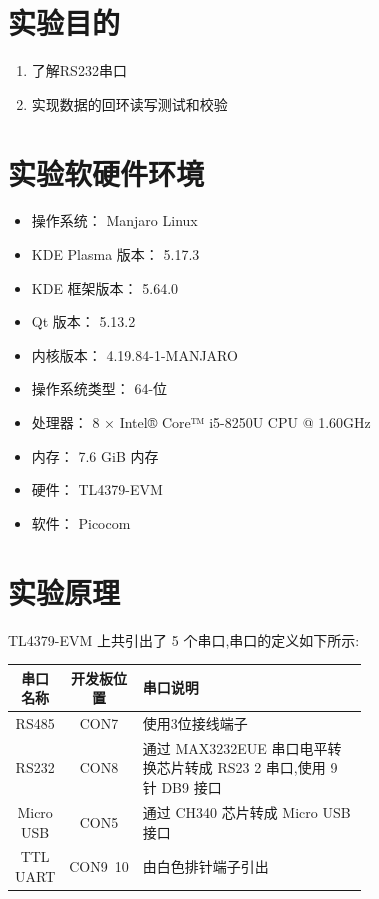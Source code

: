 \documentclass{embedding}
\begin{document}
\maketitle

\tableofcontents
\newpage

\section{实验目的}

\begin{enumerate}
\item 了解RS232串口
\item 实现数据的回环读写测试和校验
\end{enumerate}

\section{实验软硬件环境}

\begin{itemize}
    \item 操作系统： Manjaro Linux 
    \item KDE Plasma 版本： 5.17.3
    \item KDE 框架版本： 5.64.0
    \item Qt 版本： 5.13.2
    \item 内核版本： 4.19.84-1-MANJARO
    \item 操作系统类型： 64-位
    \item 处理器： 8 × Intel® Core™ i5-8250U CPU @ 1.60GHz
    \item 内存： 7.6 GiB 内存
    \item 硬件： TL4379-EVM
    \item 软件： Picocom
\end{itemize}

\section{实验原理}

TL4379-EVM 上共引出了 5 个串口,串口的定义如下所示:
\begin{table}[H]
    \centering
    \begin{tabular}{|c|c|p{0.7\linewidth}|}
        \hline 
        串口名称 & 开发板位置 & 串口说明 \\ 
        \hline 
        RS485 & CON7 & 使用3位接线端子 \\ 
        \hline 
        RS232 & CON8 & 通过 MAX3232EUE 串口电平转换芯片转成 RS23
        2 串口,使用 9 针 DB9 接口
        \\ 
        \hline 
        Micro USB & CON5
        & 通过 CH340 芯片转成 Micro USB 接口
        \\ 
        \hline 
        TTL UART & CON9~10
        & 由白色排针端子引出
        \\ 
        \hline 
    \end{tabular} 
\end{table}
\end{document}
